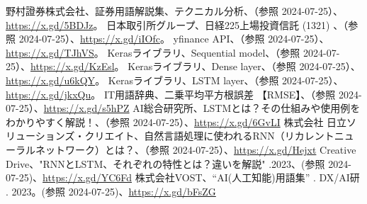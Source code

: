 \documentclass[a4paper, 11pt, titlepage]{jsarticle}
\begin{document}
\begin{thebibliography}{99}
   野村證券株式会社、証券用語解説集、テクニカル分析、（参照 2024-07-25）、\url{https://x.gd/5BDJz}。
   日本取引所グループ、日経225上場投資信託 (1321) 、（参照 2024-07-25）、\url{https://x.gd/iIOfc}。
   yfinance API、（参照 2024-07-25）、\url{https://x.gd/TJhVS}。
   Kerasライブラリ、Sequential model、（参照 2024-07-25）、\url{https://x.gd/KzEsl}。
   Kerasライブラリ、Dense layer、（参照 2024-07-25）、\url{https://x.gd/u6kQY}。
   Kerasライブラリ、LSTM layer、（参照 2024-07-25）、\url{https://x.gd/jkxQu}。
   IT用語辞典、二乗平均平方根誤差 【RMSE】、（参照 2024-07-25）、\url{https://x.gd/s5hPZ}
   AI総合研究所、LSTMとは？その仕組みや使用例をわかりやすく解説！、（参照 2024-07-25）、\url{https://x.gd/6GvLI}
   株式会社 日立ソリューションズ・クリエイト、自然言語処理に使われるRNN（リカレントニューラルネットワーク）とは？、（参照 2024-07-25）、\url{https://x.gd/Hejxt}
   Creative Drive、"RNNとLSTM、それぞれの特性とは？違いを解説" .2023、(参照 2024-07-25)、\url{https://x.gd/YC6Fd}
   株式会社VOST、“AI(人工知能)用語集” . DX/AI研 . 2023。(参照 2024-07-25)、\url{https://x.gd/bFsZG}
\end{thebibliography}
\end{document}
